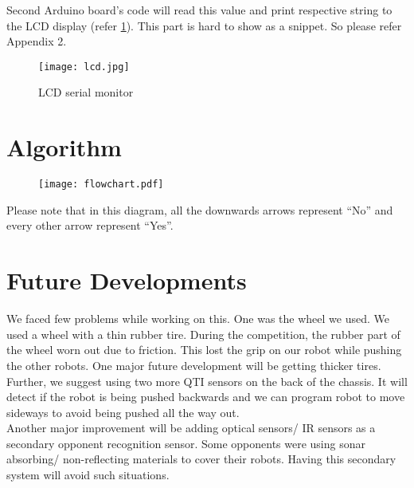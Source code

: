 \documentclass[11pt, letterpaper, oneside]{article}
\begin{document}
Second Arduino board's code will read this value and print respective string to the LCD display (refer \cref{fig:lcd}). This part is hard to show as a snippet. So please refer Appendix 2.


\begin{figure}[bth]
	\begin{center}
		\texttt{[image: lcd.jpg]}
		\caption{LCD serial monitor}
		\label{fig:lcd}
	\end{center}
\end{figure}


\newpage
\section{Algorithm}
\begin{figure}[h!]
	\begin{center}
		\texttt{[image: flowchart.pdf]}
		\label{fig:flowchart}
	\end{center}
\end{figure}

Please note that in this diagram, all the downwards arrows represent ``No'' and every other arrow represent ``Yes''.
\newpage
\section{Future Developments}

We faced few problems while working on this. One was the wheel we used. We used a wheel with a thin rubber tire. During the competition, the rubber part of the wheel worn out due to friction. This lost the grip on our robot while pushing the other robots. One major future development will be getting thicker tires.\\

Further, we suggest using two more QTI sensors on the back of the chassis. It will detect if the robot is being pushed backwards and we can program robot to move sideways to avoid being pushed all the way out.\\

Another major improvement will be adding optical sensors/ IR sensors as a secondary opponent recognition sensor. Some opponents were using sonar absorbing/ non-reflecting materials to cover their robots. Having this secondary system will avoid such situations.\\
\end{document}
